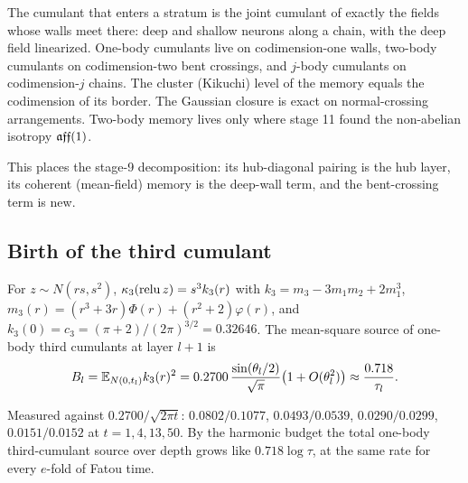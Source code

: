 \begin{corollary}[Kikuchi level $=$ codimension; proved at third order, by Proposition~\ref{prop:chain} in general]\label{cor:kikuchi}
The cumulant that enters a stratum is the joint cumulant of exactly the fields whose walls meet there: deep and shallow neurons along a
chain, with the deep field linearized. One-body cumulants live on codimension-one walls, two-body cumulants on codimension-two bent
crossings, and $j$-body cumulants on codimension-$j$ chains. The cluster (Kikuchi) level of the memory equals the codimension of its
border. The Gaussian closure is exact on normal-crossing arrangements. Two-body memory lives only where stage 11 found the non-abelian
isotropy $\mathfrak{aff}(1)$.
\end{corollary}
This places the stage-9 decomposition: its hub-diagonal pairing is the hub layer, its coherent (mean-field) memory is the deep-wall
term, and the bent-crossing term is new.

\subsection{Birth of the third cumulant}
\begin{proposition}\label{prop:birth}
For $z\sim N(rs,s^2)$, $\kappa_3(\operatorname{relu} z)=s^3k_3(r)$ with $k_3=m_3-3m_1m_2+2m_1^3$, $m_3(r)=(r^3+3r)\Phi(r)+(r^2+2)\varphi(r)$, and
$k_3(0)=c_3=(\pi+2)/(2\pi)^{3/2}=0.32646$. The mean-square source of one-body third cumulants at layer $l+1$ is
\[
B_l=\mathbb E_{N(0,t_l)}k_3(r)^2=0.2700\,\frac{\sin(\theta_l/2)}{\sqrt\pi}\big(1+O(\theta_l^2)\big)\approx\frac{0.718}{\tau_l}.
\]
\end{proposition}
Measured against $0.2700/\sqrt{2\pi t}$: $0.0802/0.1077$, $0.0493/0.0539$, $0.0290/0.0299$, $0.0151/0.0152$ at $t=1,4,13,50$. By the
harmonic budget the total one-body third-cumulant source over depth grows like $0.718\log\tau$, at the same rate for every $e$-fold of
Fatou time.

